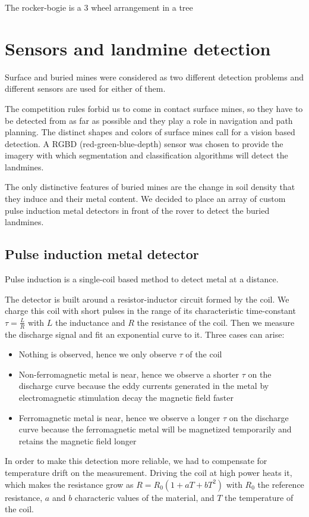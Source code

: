 The rocker-bogie is a 3 wheel arrangement in a tree

\section{Sensors and landmine detection}
Surface and buried mines were considered as two different detection problems and different sensors are used for either of them.

The competition rules forbid us to come in contact surface mines, so they have to be detected from as far as possible and they play a role in navigation and path planning.
The distinct shapes and colors of surface mines call for a vision based detection.
A RGBD (red-green-blue-depth) sensor was chosen to provide the imagery with which segmentation and classification algorithms will detect the landmines.

The only distinctive features of buried mines are the change in soil density that they induce and their metal content.
We decided to place an array of custom pulse induction metal detectors in front of the rover to detect the buried landmines.

\subsection{Pulse induction metal detector}
Pulse induction is a single-coil based method to detect metal at a distance.

The detector is built around a resistor-inductor circuit formed by the coil.
We charge this coil with short pulses in the range of its characteristic time-constant $\tau = \frac{L}{R}$ with $L$ the inductance and $R$ the resistance of the coil.
Then we measure the discharge signal and fit an exponential curve to it.
Three cases can arise:
\begin{itemize}
    \item Nothing is observed, hence we only observe $\tau$ of the coil
    \item Non-ferromagnetic metal is near, hence we observe a shorter $\tau$ on the discharge curve because the eddy currents generated in the metal by electromagnetic stimulation decay the magnetic field faster
    \item Ferromagnetic metal is near, hence we observe a longer $\tau$ on the discharge curve because the ferromagnetic metal will be magnetized temporarily and retains the magnetic field longer
\end{itemize}
In order to make this detection more reliable, we had to compensate for temperature drift on the measurement.
Driving the coil at high power heats it, which makes the resistance grow as $R = R_0 (1 + a T + b T^2)$ with $R_0$ the reference resistance, $a$ and $b$ characteric values of the material, and $T$ the temperature of the coil.


